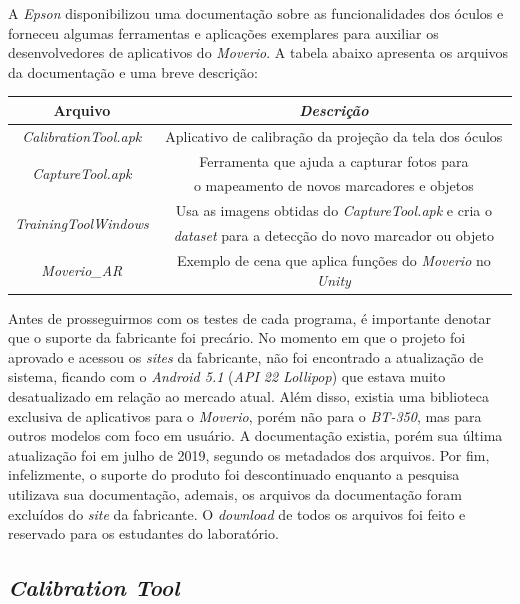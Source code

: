 A \textit{Epson} disponibilizou uma documentação sobre as funcionalidades dos óculos e forneceu algumas ferramentas e aplicações exemplares para auxiliar os desenvolvedores de aplicativos do \textit{Moverio}. A tabela abaixo apresenta os arquivos da documentação e uma breve descrição:

\begin{center}
    \begin{tabular}{ |c|c| } 
        \hline
        \textbf{Arquivo} & \textit{\textbf{Descrição}} \\ 
        \hline
        \textit{CalibrationTool.apk} & Aplicativo de calibração da projeção da tela dos óculos\\ 
        \hline
        \multirow{2}{*}{\textit{CaptureTool.apk}} & Ferramenta que ajuda a capturar fotos para \\  & o mapeamento de novos marcadores e objetos \\
        \hline
        \multirow{2}{*}{\textit{TrainingToolWindows}} & Usa as imagens obtidas do \textit{CaptureTool.apk} e cria o \\ & \textit{dataset} para a detecção do novo marcador ou objeto  \\
        \hline
        \textit{Moverio\_AR} & Exemplo de cena que aplica funções do \textit{Moverio} no \textit{Unity} \\ 
        \hline
    \end{tabular}
\end{center}

Antes de prosseguirmos com os testes de cada programa, é importante denotar que o suporte da fabricante foi precário. No momento em que o projeto foi aprovado e acessou os \textit{sites} da fabricante, não foi encontrado a atualização de sistema, ficando com o \textit{Android 5.1} (\textit{API 22 Lollipop}) que estava muito desatualizado em relação ao mercado atual. Além disso, existia uma biblioteca exclusiva de aplicativos para o \textit{Moverio}, porém não para o \textit{BT-350}, mas para outros modelos com foco em usuário. A documentação existia, porém sua última atualização foi em julho de 2019, segundo os metadados dos arquivos. Por fim, infelizmente, o suporte do produto foi descontinuado enquanto a pesquisa utilizava sua documentação, ademais, os arquivos da documentação foram excluídos do \textit{site} da fabricante. O \textit{download} de todos os arquivos foi feito e reservado para os estudantes do laboratório.

\subsection{\textit{Calibration Tool}}

